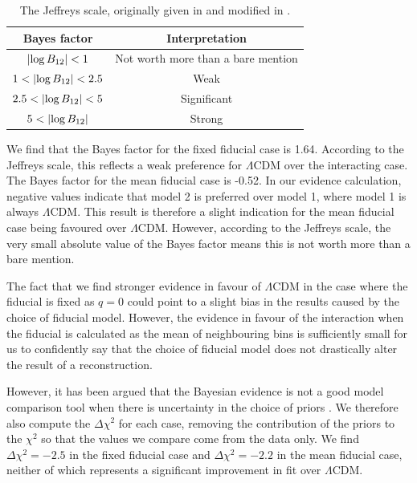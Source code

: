 \documentclass[final,3p,times,twocolumn]{elsarticle}
\begin{document}
\begin{table}
\centering
\begin{tabular}{|c|c|}
\hline
Bayes factor & Interpretation\\
\hline
$ \abs{\log B_{12}} < 1$ & Not worth more than a bare mention\\ %
$ 1 <  \abs{\log B_{12}} < 2.5 $ & Weak \\ %
$2.5 <  \abs{\log B_{12}} < 5$ & Significant \\ %
$5 <  \abs{\log B_{12}} $ & Strong \\ %
\hline
\end{tabular}
\caption{The Jeffreys scale, originally given in \protect\cite{Jeffreys} and modified in \protect\cite{Hobson}.\label{tab:jeffreys}}
\end{table}

We find that the Bayes factor for the fixed fiducial case is 1.64. According to the Jeffreys scale, this reflects a weak preference for $\Lambda$CDM over the interacting case. The Bayes factor for the mean fiducial case is -0.52. In our evidence calculation, negative values indicate that model 2 is preferred over model 1, where model 1 is always $\Lambda$CDM. This result is therefore a slight indication for the mean fiducial case being favoured over $\Lambda$CDM. However, according to the Jeffreys scale, the very small absolute value of the Bayes factor means this is not worth more than a bare mention.

The fact that we find stronger evidence in favour of $\Lambda$CDM in the case where the fiducial is fixed as $q=0$ could point to a slight bias in the results caused by the choice of fiducial model. However, the evidence in favour of the interaction when the fiducial is calculated as the mean of neighbouring bins is sufficiently small for us to confidently say that the choice of fiducial model does not drastically alter the result of a reconstruction.

However, it has been argued that the Bayesian evidence is not a good model comparison tool when there is uncertainty in the choice of priors \cite{Efstathiou2008}. We therefore also compute the $\Delta \chi^2$ for each case, removing the contribution of the priors to the $\chi^2$ so that the values we compare come from the data only. We find $\Delta \chi^2 = -2.5$ in the fixed fiducial case and  $\Delta \chi^2 = -2.2$ in the mean fiducial case, neither of which represents a significant improvement in fit over $\Lambda$CDM.
\end{document}
